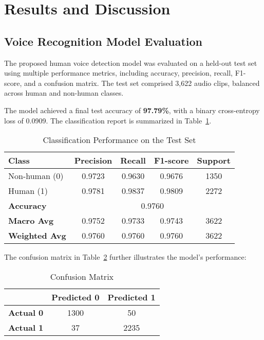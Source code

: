 \section{Results and Discussion}

\subsection{Voice Recognition Model Evaluation}
The proposed human voice detection model was evaluated on a held-out test set using multiple performance metrics, including accuracy, precision, recall, F1-score, and a confusion matrix. The test set comprised 3,622 audio clips, balanced across human and non-human classes.

The model achieved a final test accuracy of \textbf{97.79\%}, with a binary cross-entropy loss of 0.0909. The classification report is summarized in Table~\ref{tab:classification}.

\begin{table}[t]
\centering
\caption{Classification Performance on the Test Set}
\label{tab:classification}
\begin{tabular}{lcccc}
\toprule
\textbf{Class} & \textbf{Precision} & \textbf{Recall} & \textbf{F1-score} & \textbf{Support} \\
\midrule
Non-human (0) & 0.9723 & 0.9630 & 0.9676 & 1350 \\
Human (1)     & 0.9781 & 0.9837 & 0.9809 & 2272 \\
\midrule
\textbf{Accuracy} & \multicolumn{4}{c}{0.9760} \\
\textbf{Macro Avg} & 0.9752 & 0.9733 & 0.9743 & 3622 \\
\textbf{Weighted Avg} & 0.9760 & 0.9760 & 0.9760 & 3622 \\
\bottomrule
\end{tabular}
\end{table}

The confusion matrix in Table~\ref{tab:confusion} further illustrates the model’s performance:

\begin{table}[t]
\centering
\caption{Confusion Matrix}
\label{tab:confusion}
\begin{tabular}{ccc}
\toprule
 & \textbf{Predicted 0} & \textbf{Predicted 1} \\
\midrule
\textbf{Actual 0} & 1300 & 50 \\
\textbf{Actual 1} & 37 & 2235 \\
\bottomrule
\end{tabular}
\end{table}

